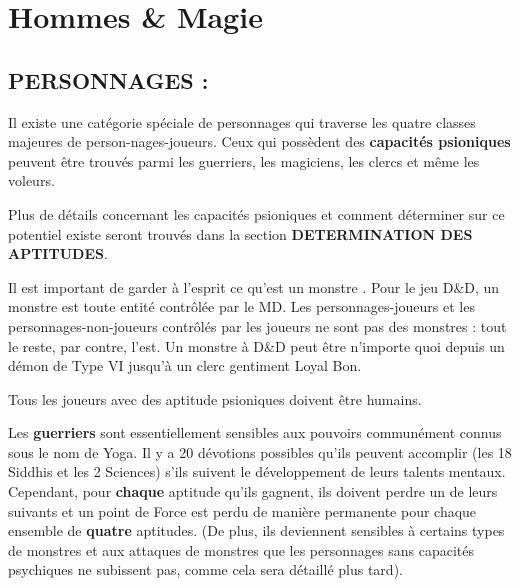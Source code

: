 \documentclass[11pt]{article}
\begin{document}
\newpage

\section*{Hommes \& Magie}

\subsection*{{\normalsize PERSONNAGES :}}

{\parindent0pt

Il existe une catégorie spéciale de personnages qui traverse les quatre classes majeures de person-nages-joueurs. Ceux qui possèdent des \textbf{capacités psioniques} peuvent être trouvés parmi les guerriers, les magiciens, les clercs et même les voleurs.

\bigskip

Plus de détails concernant les capacités psioniques et comment déterminer sur ce potentiel existe seront trouvés dans la section \textbf{DETERMINATION DES APTITUDES}.

\bigskip

Il est important de garder à l'esprit ce qu'est un \og monstre \fg{}. Pour le jeu D\&D, un monstre est toute entité contrôlée par le MD. Les personnages-joueurs et les personnages-non-joueurs contrôlés par les joueurs ne sont pas des monstres : tout le reste, par contre, l'est. Un monstre à D\&D peut être n'importe quoi depuis un démon de Type VI jusqu'à un clerc gentiment Loyal Bon.

\bigskip

Tous les joueurs avec des aptitude psioniques doivent être humains.

\bigskip

Les \textbf{guerriers} sont essentiellement sensibles aux pouvoirs communément connus sous le nom de Yoga. Il y a 20 \og dévotions \fg{} possibles qu'ils peuvent accomplir (les 18 Siddhis et les 2 Sciences) s'ils suivent le développement de leurs talents mentaux. Cependant, pour \textbf{chaque} aptitude qu'ils gagnent, ils doivent perdre un de leurs suivants et un point de Force est perdu de manière permanente pour chaque ensemble de \textbf{quatre} aptitudes. (De plus, ils deviennent sensibles à certains types de monstres et aux attaques de monstres que les personnages sans capacités psychiques ne subissent pas, comme cela sera détaillé plus tard).

}
\end{document}
